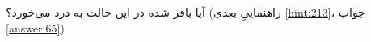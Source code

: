 \section{}
\paragraph{}\label{hint:183}
آیا  بافر شده در این حالت به درد می‌خورد؟ (راهنماییِ بعدی \ref{hint:213}، جواب \ref{answer:65})